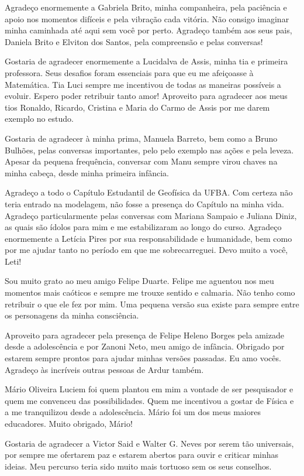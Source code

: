   Agradeço enormemente a Gabriela Brito, minha companheira, pela paciência e apoio nos momentos difíceis e pela vibração cada vitória. Não consigo imaginar minha caminhada até aqui sem você por perto. Agradeço também aos seus pais, Daniela Brito e Elviton dos Santos, pela compreensão e pelas conversas!

  Gostaria de agradecer enormemente a Lucidalva de Assis, minha tia e primeira professora. Seus desafios foram essenciais para que eu me afeiçoasse à Matemática. Tia Luci sempre me incentivou de todas as maneiras possíveis a evoluir. Espero poder retribuir tanto amor! Aproveito para agradecer aos meus tios Ronaldo, Ricardo, Cristina e Maria do Carmo de Assis por me darem exemplo no estudo.

  Gostaria de agradecer à minha prima, Manuela Barreto, bem como a Bruno Bulhões, pelas conversas importantes, pelo pelo exemplo nas ações e pela leveza. Apesar da pequena frequência, conversar com Manu sempre virou chaves na minha cabeça, desde minha primeira infância.

  Agradeço a todo o Capítulo Estudantil de Geofísica da UFBA. Com certeza não teria entrado na modelagem, não fosse a presença do Capítulo na minha vida. Agradeço particularmente pelas conversas com Mariana Sampaio e Juliana Diniz, as quais são ídolos para mim e me estabilizaram ao longo do curso. Agradeço enormemente a Letícia Pires por sua responsabilidade e humanidade, bem como por me ajudar tanto no período em que me sobrecarreguei. Devo muito a você, Leti!

  Sou muito grato ao meu amigo Felipe Duarte. Felipe me aguentou nos meu momentos mais caóticos e sempre me trouxe sentido e calmaria. Não tenho como retribuir o que ele fez por mim. Uma pequena versão sua existe para sempre entre os personagens da minha consciência.

  Aproveito para agradecer pela presença de Felipe Heleno Borges pela amizade desde a adolescência e por Zanoni Neto, meu amigo de infância. Obrigado por estarem sempre prontos para ajudar minhas versões passadas. Eu amo vocês. Agradeço às incríveis outras pessoas de Ardur também.

  Mário Oliveira Luciem foi quem plantou em mim a vontade de ser pesquisador e quem me convenceu das possibilidades. Quem me incentivou a gostar de Física e a me tranquilizou desde a adolescência. Mário foi um dos meus maiores educadores. Muito obrigado, Mário!

  Gostaria de agradecer a Victor Said e Walter G. Neves por serem tão universais, por sempre me ofertarem paz e estarem abertos para ouvir e criticar minhas ideias. Meu percurso teria sido muito mais tortuoso sem os seus conselhos.

